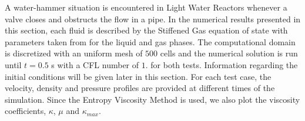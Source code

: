 \documentclass{mc2015}
\begin{document}
A water-hammer situation is encountered in Light Water Reactors whenever a valve closes and obstructs the flow in a pipe. In the numerical results presented in this section, each fluid is described by the Stiffened Gas equation of state \cite{SGEOS} with parameters taken from \cite{SEM} for the liquid and gas phases. The computational domain is discretized with an uniform mesh of $500$ cells and the numerical solution is run until $t = 0.5$ s with a CFL number of $1.$ for both tests. Information regarding the initial conditions will be given later in this section. 
For each test case, the velocity, density and pressure profiles are provided at different times of the simulation. Since the Entropy Viscosity Method is used, we also plot the viscosity coefficients, $\kappa$, $\mu$ and $\kappa_{max}$.
%
\end{document}
